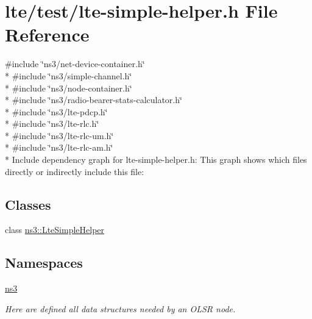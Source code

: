 \hypertarget{lte-simple-helper_8h}{}\section{lte/test/lte-\/simple-\/helper.h File Reference}
\label{lte-simple-helper_8h}
{\ttfamily \#include \char`\"{}ns3/net-\/device-\/container.\+h\char`\"{}}\\*
{\ttfamily \#include \char`\"{}ns3/simple-\/channel.\+h\char`\"{}}\\*
{\ttfamily \#include \char`\"{}ns3/node-\/container.\+h\char`\"{}}\\*
{\ttfamily \#include \char`\"{}ns3/radio-\/bearer-\/stats-\/calculator.\+h\char`\"{}}\\*
{\ttfamily \#include \char`\"{}ns3/lte-\/pdcp.\+h\char`\"{}}\\*
{\ttfamily \#include \char`\"{}ns3/lte-\/rlc.\+h\char`\"{}}\\*
{\ttfamily \#include \char`\"{}ns3/lte-\/rlc-\/um.\+h\char`\"{}}\\*
{\ttfamily \#include \char`\"{}ns3/lte-\/rlc-\/am.\+h\char`\"{}}\\*
Include dependency graph for lte-\/simple-\/helper.h\+:
This graph shows which files directly or indirectly include this file\+:
\subsection*{Classes}
\begin{DoxyCompactItemize}
\item 
class \hyperlink{classns3_1_1LteSimpleHelper}{ns3\+::\+Lte\+Simple\+Helper}
\end{DoxyCompactItemize}
\subsection*{Namespaces}
\begin{DoxyCompactItemize}
\item 
 \hyperlink{namespacens3}{ns3}
\begin{DoxyCompactList}\small\item\em Here are defined all data structures needed by an O\+L\+SR node. \end{DoxyCompactList}\end{DoxyCompactItemize}
